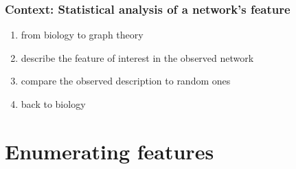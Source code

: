 \documentclass{beamer}
\begin{document}
\begin{frame}
\frametitle{Context: Statistical analysis of a network's feature}

\begin{enumerate}
\item from biology to graph theory
\item describe the feature of interest in the observed network %
\item compare the observed description to random ones 
\item back to biology 
\end{enumerate}


\end{frame}






\section{Enumerating features}




\end{document}
